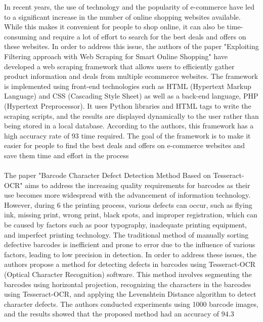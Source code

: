 In recent years, the use of technology and the popularity of e-commerce have led to a 
significant increase in the number of online shopping websites available. While this 
makes it convenient for people to shop online, it can also be time-consuming and 
require a lot of effort to search for the best deals and offers on these websites. In order 
to address this issue, the authors of the paper "Exploiting Filtering approach with Web 
Scraping for Smart Online Shopping" have developed a web scraping framework that 
allows users to efficiently gather product information and deals from multiple ecommerce websites. The framework is implemented using front-end technologies such 
as HTML (Hypertext Markup Language) and CSS (Cascading Style Sheet) as well as 
a back-end language, PHP (Hypertext Preprocessor). It uses Python libraries and 
HTML tags to write the scraping scripts, and the results are displayed dynamically to 
the user rather than being stored in a local database. According to the authors, this 
framework has a high accuracy rate of 93%
time required. The goal of the framework is to make it easier for people to find the best 
deals and offers on e-commerce websites and save them time and effort in the process 
\\
\\
The paper "Barcode Character Defect Detection Method Based on Tesseract-OCR" 
aims to address the increasing quality requirements for barcodes as their use becomes 
more widespread with the advancement of information technology. However, during 
6
the printing process, various defects can occur, such as flying ink, missing print, wrong 
print, black spots, and improper registration, which can be caused by factors such as 
poor typography, inadequate printing equipment, and imperfect printing technology. 
The traditional method of manually sorting defective barcodes is inefficient and prone 
to error due to the influence of various factors, leading to low precision in detection. In 
order to address these issues, the authors propose a method for detecting defects in 
barcodes using Tesseract-OCR (Optical Character Recognition) software. This method 
involves segmenting the barcodes using horizontal projection, recognizing the 
characters in the barcodes using Tesseract-OCR, and applying the Levenshtein 
Distance algorithm to detect character defects. The authors conducted experiments 
using 1000 barcode images, and the results showed that the proposed method had an 
accuracy of 94.3%
